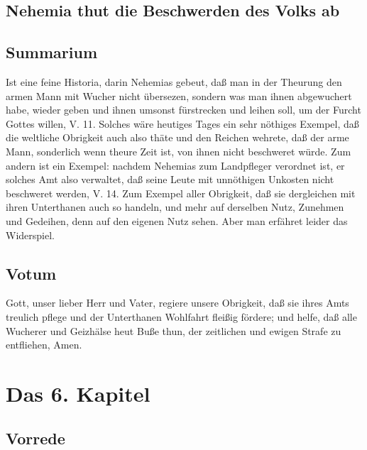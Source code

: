 \section{Nehemia thut die Beschwerden des Volks ab}


\section{Summarium}

Ist eine feine Historia, darin Nehemias gebeut, daß man in der Theurung den armen Mann mit Wucher nicht übersezen, sondern was man ihnen abgewuchert habe, wieder geben und ihnen umsonst fürstrecken und leihen soll, um der Furcht Gottes willen, V. 11. Solches wäre heutiges Tages ein sehr nöthiges Exempel, daß die weltliche Obrigkeit auch also thäte und den Reichen wehrete, daß der arme Mann, sonderlich wenn theure Zeit ist, von ihnen nicht beschweret würde. Zum andern ist ein Exempel: nachdem Nehemias zum Landpfleger verordnet ist, er solches Amt also verwaltet, daß seine Leute mit unnöthigen Unkosten nicht beschweret werden, V. 14. Zum Exempel aller Obrigkeit, daß sie dergleichen mit ihren Unterthanen auch so handeln, und mehr auf derselben Nutz, Zunehmen und Gedeihen, denn auf den eigenen Nutz sehen. Aber man erfähret leider das Widerspiel.

\section{Votum}

Gott, unser lieber Herr und Vater, regiere unsere Obrigkeit, daß sie ihres Amts treulich pflege und der Unterthanen Wohlfahrt fleißig fördere; und helfe, daß alle Wucherer und Geizhälse heut Buße thun, der zeitlichen und ewigen Strafe zu entfliehen, Amen.

\chapter{Das 6. Kapitel}

\section{Vorrede}

